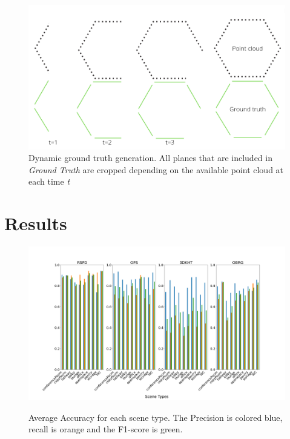 \documentclass[main.tex]{subfiles}
\begin{document}
\begin{figure}[H]
    \centering
    \includegraphics[width=15 cm]{images/dynamic_eval.png}
    \caption[Dynamic Ground Truth Generation]{Dynamic ground truth generation. All planes that are included in \textit{Ground Truth} are cropped depending on
        the available point cloud at each time \textit{t} }
    \label{fig:dynGT}
\end{figure}


\section{Results}

\begin{figure}[H]
    \centering
    \includegraphics[width=15 cm]{images/accuracy_total.png}
    \label{fig:accuracy_s3dis}
    \caption[Accuracy Results S3DIS]{Average Accuracy for each scene type. The Precision
        is colored blue, recall is orange and the F1-score is green.}
\end{figure}
\end{document}
